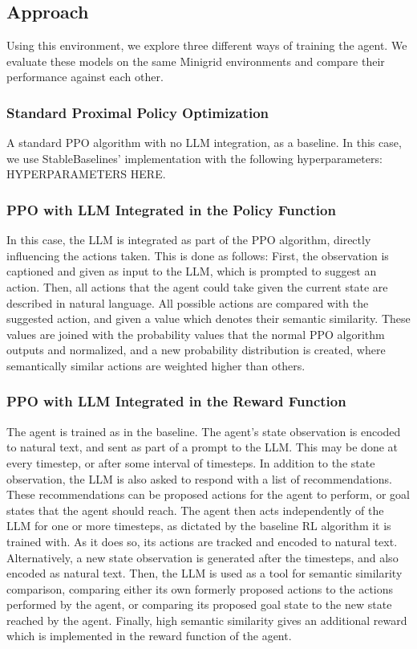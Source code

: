 \documentclass[conference]{IEEEtran}
\begin{document}
\subsection{Approach}

Using this environment, we explore three different ways of training the agent. We evaluate these models on the same Minigrid environments and compare their performance against each other.\\

\subsubsection{Standard Proximal Policy Optimization}

A standard PPO algorithm with no LLM integration, as a baseline. In this case, we use StableBaselines' implementation with the following hyperparameters: HYPERPARAMETERS HERE.

\subsubsection{PPO with LLM Integrated in the Policy Function}

In this case, the LLM is integrated as part of the PPO algorithm, directly influencing the actions taken. This is done as follows: First, the observation is captioned and given as input to the LLM, which is prompted to suggest an action. Then, all actions that the agent could take given the current state are described in natural language. All possible actions are compared with the suggested action, and given a value which denotes their semantic similarity. These values are joined with the probability values that the normal PPO algorithm outputs and normalized, and a new probability distribution is created, where semantically similar actions are weighted higher than others.

\subsubsection{PPO with LLM Integrated in the Reward Function}

The agent is trained as in the baseline. The agent's state observation is encoded to natural text, and sent as part of a prompt to the LLM. This may be done at every timestep, or after some interval of timesteps. In addition to the state observation, the LLM is also asked to respond with a list of recommendations. These recommendations can be proposed actions for the agent to perform, or goal states that the agent should reach. The agent then acts independently of the LLM for one or more timesteps, as dictated by the baseline RL algorithm it is trained with. As it does so, its actions are tracked and encoded to natural text. Alternatively, a new state observation is generated after the timesteps, and also encoded as natural text. Then, the LLM is used as a tool for semantic similarity comparison, comparing either its own formerly proposed actions to the actions performed by the agent, or comparing its proposed goal state to the new state reached by the agent. Finally, high semantic similarity gives an additional reward which is implemented in the reward function of the agent. 
\end{document}
